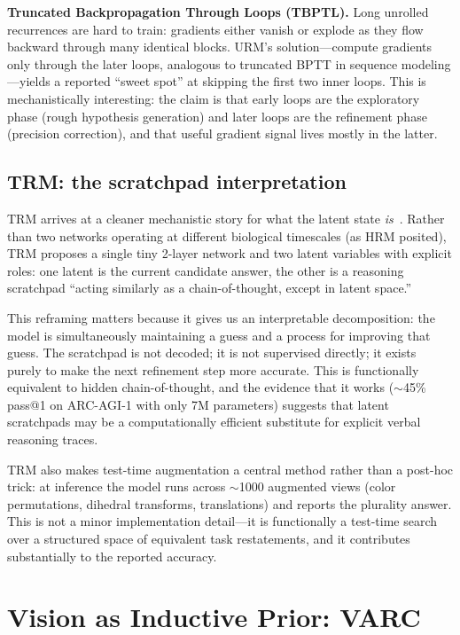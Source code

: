 \documentclass[11pt, letterpaper]{article}
\begin{document}
\textbf{Truncated Backpropagation Through Loops (TBPTL).} Long unrolled
recurrences are hard to train: gradients either vanish or explode as they
flow backward through many identical blocks. URM's solution---compute
gradients only through the later loops, analogous to truncated BPTT in
sequence modeling---yields a reported ``sweet spot'' at skipping the first
two inner loops. This is mechanistically interesting: the claim is that
early loops are the exploratory phase (rough hypothesis generation) and
later loops are the refinement phase (precision correction), and that useful
gradient signal lives mostly in the latter.

\subsection{TRM: the scratchpad interpretation}

TRM arrives at a cleaner mechanistic story for what the latent state
\emph{is}~\cite{jolicoeur2025trm}. Rather than two networks operating at
different biological timescales (as HRM posited), TRM proposes a single tiny
2-layer network and two latent variables with explicit roles: one latent is
the current candidate answer, the other is a reasoning scratchpad ``acting
similarly as a chain-of-thought, except in latent space.''

This reframing matters because it gives us an interpretable decomposition:
the model is simultaneously maintaining a guess and a process for improving
that guess. The scratchpad is not decoded; it is not supervised directly;
it exists purely to make the next refinement step more accurate. This is
functionally equivalent to hidden chain-of-thought, and the evidence that
it works ($\sim$45\% pass@1 on ARC-AGI-1 with only 7M parameters) suggests
that latent scratchpads may be a computationally efficient substitute for
explicit verbal reasoning traces.

TRM also makes test-time augmentation a central method rather than a
post-hoc trick: at inference the model runs across $\sim$1000 augmented
views (color permutations, dihedral transforms, translations) and reports
the plurality answer. This is not a minor implementation detail---it is
functionally a test-time search over a structured space of equivalent
task restatements, and it contributes substantially to the reported accuracy.

\section{Vision as Inductive Prior: VARC}
\label{sec:varc}
\end{document}
